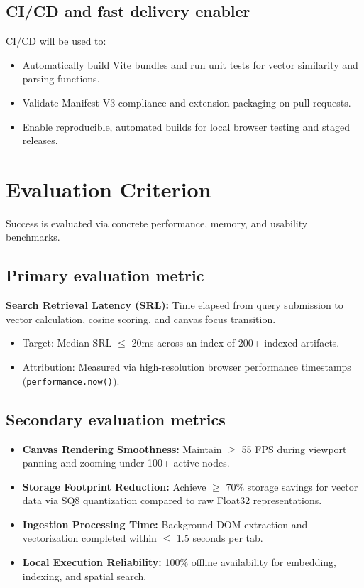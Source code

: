 \documentclass[11pt,a4paper]{article}
\begin{document}
\subsection{CI/CD and fast delivery enabler}
CI/CD will be used to:
\begin{itemize}[leftmargin=0.7cm]
    \item Automatically build Vite bundles and run unit tests for vector similarity and parsing functions.
    \item Validate Manifest V3 compliance and extension packaging on pull requests.
    \item Enable reproducible, automated builds for local browser testing and staged releases.
\end{itemize}

\section{Evaluation Criterion}
Success is evaluated via concrete performance, memory, and usability benchmarks.

\subsection{Primary evaluation metric}
\textbf{Search Retrieval Latency (SRL):} Time elapsed from query submission to vector calculation, cosine scoring, and canvas focus transition.
\begin{itemize}[leftmargin=0.7cm]
    \item Target: Median SRL $\le$ 20ms across an index of 200+ indexed artifacts.
    \item Attribution: Measured via high-resolution browser performance timestamps (\texttt{performance.now()}).
\end{itemize}

\subsection{Secondary evaluation metrics}
\begin{itemize}[leftmargin=0.7cm]
    \item \textbf{Canvas Rendering Smoothness:} Maintain $\ge$ 55 FPS during viewport panning and zooming under 100+ active nodes.
    \item \textbf{Storage Footprint Reduction:} Achieve $\ge$ 70\% storage savings for vector data via SQ8 quantization compared to raw Float32 representations.
    \item \textbf{Ingestion Processing Time:} Background DOM extraction and vectorization completed within $\le$ 1.5 seconds per tab.
    \item \textbf{Local Execution Reliability:} 100\% offline availability for embedding, indexing, and spatial search.
\end{itemize}
\end{document}
